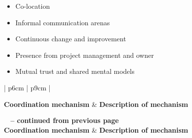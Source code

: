 \begin{itemize}
   \item Co-location
   \item Informal communication arenas
   \item Continuous change and improvement
   \item Presence from project management and owner
   \item Mutual trust and shared mental models
\end{itemize}

\begin{center}
    \begin{longtable}{| p{6cm} | p{9cm} |}

    \hline \textbf{Coordination mechanism} & \textbf{Description of mechanism} \\ \hline
    \endfirsthead

{{\bfseries \tablename\ \thetable{} -- continued from previous page}} \\ \hline
    \textbf{Coordination mechanism} & \textbf{Description of mechanism} \\ \hline
    \endhead

     \\ \hline
    \endfoot

   \endlastfoot


\end{longtable}
\end{center}
